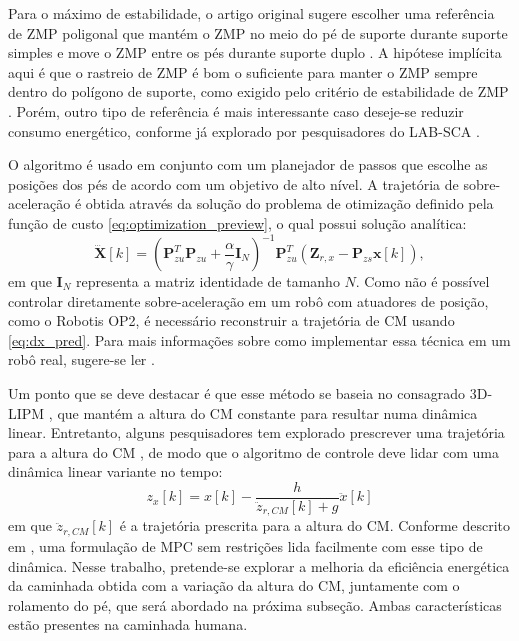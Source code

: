 Para o máximo de estabilidade, o artigo original sugere escolher uma referência de ZMP poligonal que mantém o ZMP no meio do pé de suporte durante suporte simples e move o ZMP entre os pés durante suporte duplo \cite{kajita2003}. A hipótese implícita aqui é que o rastreio de ZMP é bom o suficiente para manter o ZMP sempre dentro do polígono de suporte, como exigido pelo critério de estabilidade de ZMP \cite{vukobratovic2004}. Porém, outro tipo de referência é mais interessante caso deseje-se reduzir consumo energético, conforme já explorado por pesquisadores do LAB-SCA \cite{max22}.

O algoritmo é usado em conjunto com um planejador de passos que escolhe as posições dos pés de acordo com um objetivo de alto nível. A trajetória de sobre-aceleração é obtida através da solução do problema de otimização definido pela função de custo \eqref{eq:optimization_preview}, o qual possui solução analítica:
\begin{equation}
\dddot{\mathrm{\mathbf{X}}}[k] = \left( \mathrm{\mathbf{P}}^T_{zu} \mathrm{\mathbf{P}}_{zu} + \frac{\alpha}{\gamma} \mathrm{\mathbf{I}}_N \right)^{-1} \mathrm{\mathbf{P}}^T_{zu} \left( \mathrm{\mathbf{Z}}_{r,x} - \mathrm{\mathbf{P}}_{zs} \mathrm{\mathbf{x}}[k] \right),
\end{equation}
em que \( \mathrm{\mathbf{I}}_N \) representa a matriz identidade de tamanho \( N \). Como não é possível controlar diretamente sobre-aceleração em um robô com atuadores de posição, como o Robotis OP2, é necessário reconstruir a trajetória de CM usando \eqref{eq:dx_pred}. Para mais informações sobre como implementar essa técnica em um robô real, sugere-se ler \cite{tesemarcos}.

Um ponto que se deve destacar é que esse método se baseia no consagrado 3D-LIPM \cite{kajita2001}, que mantém a altura do CM constante para resultar numa dinâmica linear. Entretanto, alguns pesquisadores tem explorado prescrever uma trajetória para a altura do CM \cite{herdt2013}, de modo que o algoritmo de controle deve lidar com uma dinâmica linear variante no tempo:
\begin{equation}
z_x\left[ k \right] = x \left[ k \right] - \frac{h}{\ddot{z}_{r,CM}\left[ k \right] + g} \ddot{x} \left[ k \right]
\end{equation}
em que \( \ddot{z}_{r,CM}[k] \) é a trajetória prescrita para a altura do CM. Conforme descrito em \cite{herdt2013}, uma formulação de MPC sem restrições lida facilmente com esse tipo de dinâmica. Nesse trabalho, pretende-se explorar a melhoria da eficiência energética da caminhada obtida com a variação da altura do CM, juntamente com o rolamento do pé, que será abordado na próxima subseção. Ambas características estão presentes na caminhada humana.

